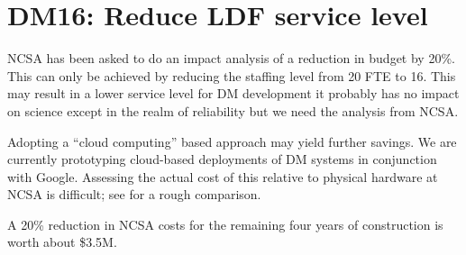 \section{DM16: Reduce LDF service level}\label{sect:dm16}

NCSA has been  asked to do an impact analysis of a reduction in budget by 20\%.
This can only be achieved by reducing the staffing level from 20 FTE to 16.
This may result in a lower service level for DM development it probably has no impact on science except in the realm of reliability but we need the analysis from NCSA.

Adopting a ``cloud computing'' based approach may yield further savings.
We are currently prototyping cloud-based deployments of DM systems in conjunction with Google.
Assessing the actual cost of this relative to physical hardware at NCSA is difficult; see  for a rough comparison.

A 20\% reduction in NCSA costs for the remaining four years of construction is worth about \$3.5M.
